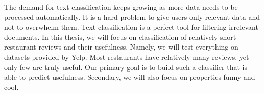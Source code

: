 \documentclass[12pt]{report}
\begin{document}

The demand for text classification keeps growing as more data needs to be processed automatically.
It is a hard problem to give users only relevant data and not to overwhelm them.
Text classification is a perfect tool for filtering irrelevant documents.
In this thesis, we will focus on classification of relatively short restaurant reviews and their usefulness.
Namely, we will test everything on datasets provided by Yelp.
Most restaurants have relatively many reviews, yet only few are truly useful.
Our primary goal is to build such a classifier that is able to predict usefulness.
Secondary, we will also focus on properties funny and cool.
\end{document}
